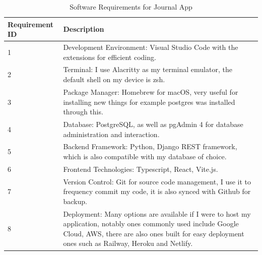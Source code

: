     
    \begin{table}[H]
        \centering
        \begin{tabular}{|l|p{10cm}|}
        \hline
        \textbf{Requirement ID} & \textbf{Description} \\ \hline
        1 & Development Environment: Visual Studio Code with the extensions for efficient coding. \\ \hline
        2 & Terminal: I use Alacritty as my terminal emulator, the default shell on my device is zsh. \\ \hline
        3 & Package Manager: Homebrew for macOS, very useful for installing new things for example postgres was installed through this. \\ \hline
        4 & Database: PostgreSQL, as well as pgAdmin 4 for database administration and interaction. \\ \hline
        5 & Backend Framework: Python, Django REST framework, which is also compatible with my database of choice. \\ \hline
        6 & Frontend Technologies: Typescript, React, Vite.js. \\ \hline
        7 & Version Control: Git for source code management, I use it to frequency commit my code, it is also synced with Github for backup. \\ \hline
        8 & Deployment: Many options are available if I were to host my application, notably ones commonly used include Google Cloud, AWS, there are also ones built for easy deployment ones such as Railway, Heroku and Netlify. \\ \hline  
        \end{tabular}
        \caption{Software Requirements for Journal App}
        \end{table}
        
